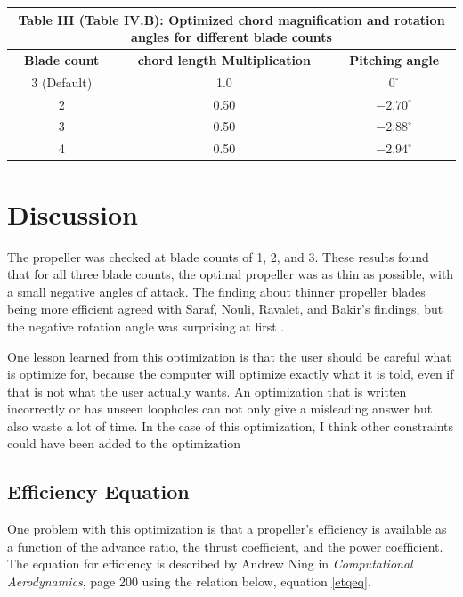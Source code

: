 \documentclass[journal ]{new-aiaa}
\begin{document}
\begin{center}
\begin{tabular}{| c | c | c |}
	 \multicolumn{3}{c}{Table III (Table IV.B): Optimized chord magnification and rotation angles for different blade counts}  \\ \hline
  	 \textbf{Blade count} & \textbf{chord length Multiplication} & \textbf{Pitching angle} \\ \hline
  	 3 (Default) & 1.0 & $0^{\circ}$ \\ \hline
  	 2 & 0.50 & $-2.70^{\circ}$ \\ \hline
  	 3 & 0.50 & $-2.88^{\circ}$ \\ \hline
  	 4 & 0.50 & $-2.94^{\circ}$ \\ \hline
\end{tabular}
\label{resultstab}
\end{center}


\section{Discussion}

The propeller was checked at blade counts of 1, 2, and 3. These results found that for all three blade counts, the optimal propeller was as thin as possible, with a small negative angles of attack. The finding about thinner propeller blades being more efficient agreed with Saraf, Nouli, Ravalet, and Bakir's findings, but the negative rotation angle was surprising at first \cite{AxFlFan}.

One lesson learned from this optimization is that the user should be careful what is optimize for, because the computer will optimize exactly what it is told, even if that is not what the user actually wants. An optimization that is written incorrectly or has unseen loopholes can not only give a misleading answer but also waste a lot of time. In the case of this optimization, I think other constraints could have been added to the optimization

\subsection{Efficiency Equation}

One problem with this optimization is that a propeller's efficiency is available as a function of the advance ratio, the thrust coefficient, and the power coefficient. The equation for efficiency is described by Andrew Ning in \emph{Computational Aerodynamics}, page 200 \cite{ComAer} using the relation below, equation \ref{etqeq}.
\end{document}
